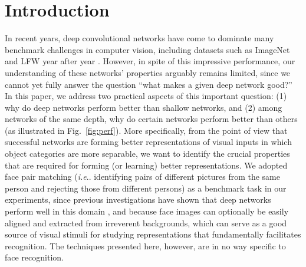\documentclass[fleqn]{article} %
\makeatletter
\DeclareRobustCommand\onedot{\futurelet\@let@token\@onedot}
\def\@onedot{\ifx\@let@token.\else.\null\fi\xspace}
\def\ie{\emph{i.e}\onedot} \def\Ie{\emph{I.e}\onedot}
\makeatother
\begin{document}
\section{Introduction}

\newcommand{\expwhyface}{Nevertheless, the methods and most observations presented in this work are in general not limited to just face pair matching, and may be generalized onto other domains in visual recognition.}

In recent years, deep convolutional networks have come to dominate many benchmark challenges in computer vision, including datasets such as ImageNet \cite{russakovsky2014imagenet} and LFW \cite{LFWTech} year after year \cite{krizhevsky2012imagenet, sermanet2013overfeat, szegedy2014going, taigman2014deepface, sun2014deep, schroff2015facenet}.  However, in spite of this impressive performance, our understanding of these networks' properties arguably remains limited, since we cannot yet fully answer the question ``what makes a given deep network good?''
In this paper, we address two practical aspects of this important question: (1) why do deep networks perform better than shallow networks, and (2) among networks of the same depth, why do certain networks perform better than others (as illustrated in Fig.~\ref{fig:perf}).
More specifically, from the point of view that successful networks are forming better representations of visual inputs in which object categories are more separable, we want to identify the crucial properties that are required for forming (or learning) better representations. 
We adopted face pair matching (\ie identifying pairs of different pictures from the same person and rejecting those from different persons) as a benchmark task in our experiments, since previous investigations have shown that deep networks perform well in this domain \cite{taigman2014deepface, sun2014deep, schroff2015facenet}, and because face images can optionally be easily aligned and extracted from irreverent backgrounds, which can serve as a good source of visual stimuli for studying representations that fundamentally facilitates recognition.  The techniques presented here, however, are in no way specific to face recognition.

\end{document}
